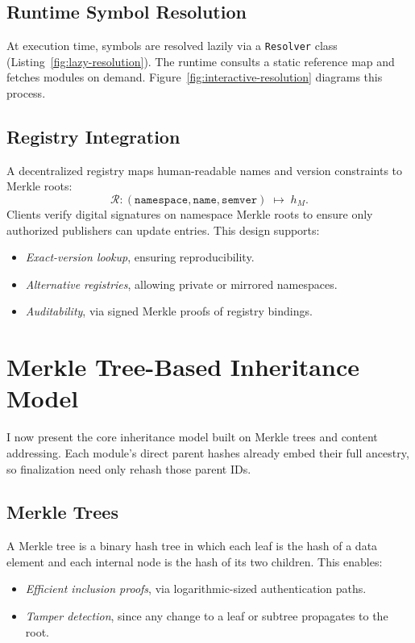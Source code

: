 \documentclass[sigplan,screen]{acmart}
\begin{document}
\subsection{Runtime Symbol Resolution}
At execution time, symbols are resolved lazily via a \texttt{Resolver} class (Listing~\ref{fig:lazy-resolution}). The runtime consults a static reference map and fetches modules on demand. Figure~\ref{fig:interactive-resolution} diagrams this process.

\subsection{Registry Integration}
A decentralized registry maps human-readable names and version constraints to Merkle roots:
\[
\mathcal{R} : (\texttt{namespace},\texttt{name},\texttt{semver}) \;\mapsto\; h_M.
\]
Clients verify digital signatures on namespace Merkle roots to ensure only authorized publishers can update entries. This design supports:
\begin{itemize}
	\item \emph{Exact-version lookup}, ensuring reproducibility.
	\item \emph{Alternative registries}, allowing private or mirrored namespaces.
	\item \emph{Auditability}, via signed Merkle proofs of registry bindings.
\end{itemize}

\section{Merkle Tree-Based Inheritance Model}
\label{sec:merkle-inheritance}

I now present the core inheritance model built on Merkle trees and content addressing. Each module's direct parent hashes already embed their full ancestry, so finalization need only rehash those parent IDs.

\subsection{Merkle Trees}
A Merkle tree is a binary hash tree in which each leaf is the hash of a data element and each internal node is the hash of its two children. This enables:
\begin{itemize}
	\item \emph{Efficient inclusion proofs}, via logarithmic-sized authentication paths.
	\item \emph{Tamper detection}, since any change to a leaf or subtree propagates to the root.
\end{itemize}
\end{document}
